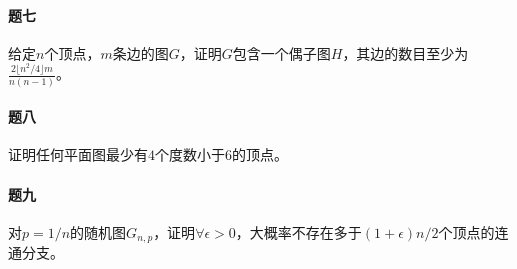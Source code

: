 \documentclass[UTF8]{ctexart}
\begin{document}
\paragraph*{题七} 
给定$n$个顶点，$m$条边的图$G$，证明$G$包含一个偶子图$H$，其边的数目至少为$\displaystyle\frac{2\lfloor n^2/4\rfloor m}{n(n-1)}$。


\paragraph*{题八} 
证明任何平面图最少有$4$个度数小于$6$的顶点。


\paragraph*{题九} 
对$p=1/n$的随机图$G_{n,p}$，证明$\forall\epsilon>0$，大概率不存在多于$(1+\epsilon)n/2$个顶点的连通分支。
\end{document}
